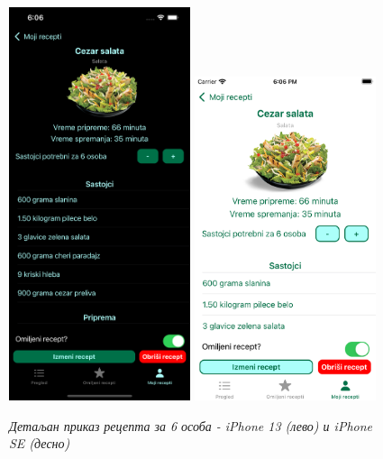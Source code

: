 \documentclass[12pt,oneside]{memoir}
\begin{document}
\begin{figure} [H]
    \centering
    \captionsetup{justification=centering}
    \includegraphics[width=0.475\textwidth]{images/simulators/view images/dark - detail6.png} 
    \hfill
    \includegraphics[width=0.475\textwidth]{images/simulators/view images/light - detail6.png} 
    \caption{\textit{Детаљан приказ рецепта за 6 особа - iPhone 13 (лево) и iPhone SE (десно)}}
    \label{slika:детаљан_рецепт_2_1}
\end{figure}
\end{document}
